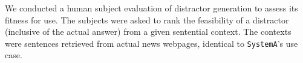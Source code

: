 %






We conducted a human subject evaluation of distractor generation to
assess its fitness for use.  The subjects were asked to rank the
feasibility of a distractor (inclusive of the actual answer) from a
given sentential context.  The contexts were sentences retrieved from
actual news webpages, identical to {\tt SystemA}'s use case.


